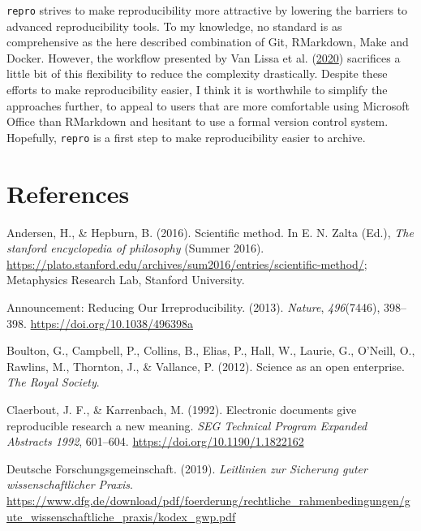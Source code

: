 \documentclass[12pt,a4paper,twoside]{article}
\begin{document}
\texttt{repro} strives to make reproducibility more attractive by lowering the barriers to advanced reproducibility tools.
To my knowledge, no standard is as comprehensive as the here described combination of Git, RMarkdown, Make and Docker.
However, the workflow presented by Van Lissa et al. (\protect\hyperlink{ref-vanlissaWORCSWorkflowOpen2020}{2020}) sacrifices a little bit of this flexibility to reduce the complexity drastically.
Despite these efforts to make reproducibility easier, I think it is worthwhile to simplify the approaches further, to appeal to users that are more comfortable using Microsoft Office than RMarkdown and hesitant to use a formal version control system.
Hopefully, \texttt{repro} is a first step to make reproducibility easier to archive.

\hypertarget{references}{%
\section*{References}\label{references}}

\hypertarget{refs}{}
\leavevmode\hypertarget{ref-andersonScientificMethod2016}{}%
Andersen, H., \& Hepburn, B. (2016). Scientific method. In E. N. Zalta (Ed.), \emph{The stanford encyclopedia of philosophy} (Summer 2016). \url{https://plato.stanford.edu/archives/sum2016/entries/scientific-method/}; Metaphysics Research Lab, Stanford University.

\leavevmode\hypertarget{ref-AnnouncementReducingOur2013}{}%
Announcement: Reducing Our Irreproducibility. (2013). \emph{Nature}, \emph{496}(7446), 398--398. \url{https://doi.org/10.1038/496398a}

\leavevmode\hypertarget{ref-boultonScienceOpenEnterprise2012}{}%
Boulton, G., Campbell, P., Collins, B., Elias, P., Hall, W., Laurie, G., O'Neill, O., Rawlins, M., Thornton, J., \& Vallance, P. (2012). Science as an open enterprise. \emph{The Royal Society}.

\leavevmode\hypertarget{ref-claerboutElectronicDocumentsGive1992}{}%
Claerbout, J. F., \& Karrenbach, M. (1992). Electronic documents give reproducible research a new meaning. \emph{SEG Technical Program Expanded Abstracts 1992}, 601--604. \url{https://doi.org/10.1190/1.1822162}

\leavevmode\hypertarget{ref-dfg2019}{}%
Deutsche Forschungsgemeinschaft. (2019). \emph{Leitlinien zur Sicherung guter wissenschaftlicher Praxis}. \url{https://www.dfg.de/download/pdf/foerderung/rechtliche_rahmenbedingungen/gute_wissenschaftliche_praxis/kodex_gwp.pdf}
\end{document}
